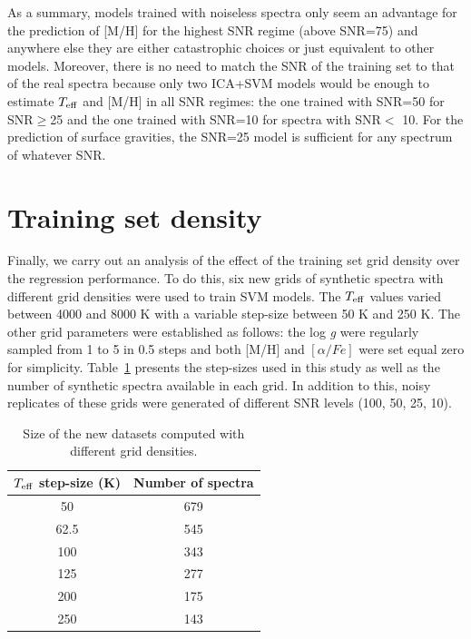 \documentclass[a4paper,fleqn,usenatbib]{mnras}
\begin{document}
{{{As a summary, models trained with noiseless spectra only seem an
advantage for the prediction of [M/H] for the highest SNR regime
(above SNR=75) and anywhere else they are either catastrophic choices
or just equivalent to other models. Moreover, there is no need to
match the SNR of the training set to that of the real spectra because
only two ICA+SVM models would be enough to estimate $T_{\rm eff}$ and
[M/H] in all SNR regimes: the one trained with SNR=50 for SNR$\ge$25
and the one trained with SNR=10 for spectra with SNR$<$ 10. For the
prediction of surface gravities, the SNR=25 model is sufficient for
any spectrum of whatever SNR.

\section{Training set density}
\label{sec:comparison3}

Finally, we carry out an analysis of the effect of the training set
grid density over the regression performance.  To do this, six new
grids of synthetic spectra with different grid densities were used to
train SVM models. The $T_{\rm eff}$ values varied between 4000 and
8000 K with a variable step-size between 50 K and 250 K. The other
grid parameters were established as follows: the log \textit{g} were
regularly sampled from 1 to 5 in 0.5 steps and both [M/H] and $\left[
  \alpha/Fe \right]$ were set equal zero for
simplicity. Table~\ref{tab:grid} presents the step-sizes used in this
study as well as the number of synthetic spectra available in each
grid.  In addition to this, noisy replicates of these grids were
generated of different SNR levels (100, 50, 25, 10).

\begin{table}
\centering
\caption{Size of the new datasets computed with different grid densities.}
\label{tab:grid}
\begin{tabular}{c c}
\hline
\textbf{$T_{\rm eff}$ step-size (K)} & \textbf{Number of spectra} \\
\hline
50 & 679 \\
62.5 & 545 \\
100 & 343 \\
125 & 277 \\
200 & 175\\
250 & 143\\
\hline
\end{tabular}
\end{table}

}}}
\end{document}

